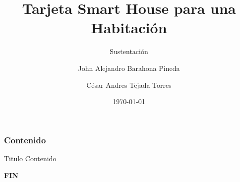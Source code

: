 \documentclass{beamer}
\title[Tarjeta Smart House para una Habitación]{Tarjeta Smart House para una Habitación}
\subtitle{Sustentación}
\author[John Barahona, César Tejada]{John Alejandro Barahona Pineda \and César Andres Tejada Torres}
\institute[UQ]{
	Universidad del Quindío\\
	Armenia, Quindío
}
\date{\today}
\begin{document}
	
	\frame{\titlepage}
	
	
	\begin{frame}
		\frametitle{Contenido}
		\begin{multicols}{2}
			\tableofcontents[hideallsubsections]
		\end{multicols} 
	\end{frame}
	
\begin{frame}
	\begin{block}{Titulo}
		Contenido
	\end{block}
\end{frame}


	 	
 
 	\begin{frame}
		
 	\end{frame}
 	
 	
 	
 	

	

		

		
 
 \begin{frame}
 	\textbf{FIN}
 \end{frame}
\end{document}
